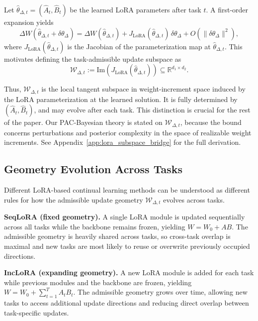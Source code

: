 \documentclass[10pt]{article} %
\begin{document}
Let $\hat{\theta}_{\Delta,t} = (\hat A_t, \hat B_t)$ be the learned LoRA parameters after task $t$.
A first-order expansion yields
\[
\Delta W(\hat{\theta}_{\Delta,t} + \delta\theta_{\Delta})
=
\Delta W(\hat{\theta}_{\Delta,t})
+
J_{\mathrm{LoRA}}(\hat{\theta}_{\Delta,t})\,\delta\theta_{\Delta}
+
O(\|\delta\theta_{\Delta}\|^2),
\]
where $J_{\mathrm{LoRA}}(\hat{\theta}_{\Delta,t})$ is the Jacobian of the parameterization map at $\hat{\theta}_{\Delta,t}$.
This motivates defining the task-admissible update subspace as
\[
\mathcal{W}_{\Delta,t}
:=
\mathrm{Im}\!\left(J_{\mathrm{LoRA}}(\hat{\theta}_{\Delta,t})\right)
\subseteq \mathbb{R}^{d_1 \times d_2}.
\]

Thus, $\mathcal{W}_{\Delta,t}$ is the local tangent subspace in weight-increment space induced by the LoRA parameterization at the learned solution.
It is fully determined by $(\hat A_t,\hat B_t)$, and may evolve after each task.
This distinction is crucial for the rest of the paper.
Our PAC-Bayesian theory is stated on $\mathcal{W}_{\Delta,t}$, because the bound concerns perturbations and posterior complexity in the space of realizable weight increments.
See Appendix~\ref{app:lora_subspace_bridge} for the full derivation.

\subsection{Geometry Evolution Across Tasks}
\label{sec:lora-orgs}

Different LoRA-based continual learning methods can be understood as different rules for how the admissible update geometry $\mathcal{W}_{\Delta,t}$ evolves across tasks.

\textbf{SeqLoRA (fixed geometry).}
A single LoRA module is updated sequentially across all tasks while the backbone remains frozen, yielding $W = W_0 + AB$.
The admissible geometry is heavily shared across tasks, so cross-task overlap is maximal and new tasks are most likely to reuse or overwrite previously occupied directions.

\textbf{IncLoRA (expanding geometry).}
A new LoRA module is added for each task while previous modules and the backbone are frozen, yielding $W = W_0 + \sum_{t=1}^T A_t B_t$.
The admissible geometry grows over time, allowing new tasks to access additional update directions and reducing direct overlap between task-specific updates.
\end{document}
